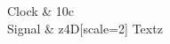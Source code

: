 \documentclass[border=3mm]{standalone}
\begin{document}
	
	\begin{tikztimingtable}[timing/xunit=30,timing/yunit=30]
		Clock & 10{c} \\
		Signal &  z4D{[scale=2] Text}z \\
	\end{tikztimingtable}
\end{document}
